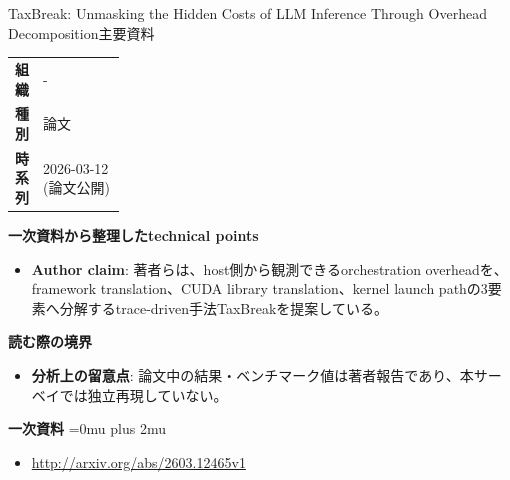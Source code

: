 \begin{technicalnote}{TaxBreak: Unmasking the Hidden Costs of LLM Inference Through Overhead Decomposition}{主要資料}
\begingroup
\begin{tabularx}{\linewidth}{@{}>{\bfseries}p{0.22\linewidth}X@{}}
組織 & - \\
種別 & 論文 \\
時系列 & 2026-03-12 (論文公開) \\
\end{tabularx}
\smallskip
{\bfseries 一次資料から整理したtechnical points}
\begin{itemize}[leftmargin=1.5em,itemsep=0.35em]
\item \textbf{Author claim}: 著者らは、host側から観測できるorchestration overheadを、framework translation、CUDA library translation、kernel launch pathの3要素へ分解するtrace-driven手法TaxBreakを提案している。
\end{itemize}
\begin{minipage}{\linewidth}
{\bfseries 読む際の境界}
\begin{itemize}[leftmargin=1.5em,itemsep=0.35em]
\item \textbf{分析上の留意点}: 論文中の結果・ベンチマーク値は著者報告であり、本サーベイでは独立再現していない。
\end{itemize}
\begin{samepage}
{\bfseries 一次資料}
\begingroup\sloppy
\Urlmuskip=0mu plus 2mu\relax
\begin{itemize}[leftmargin=1.5em,itemsep=0.25em]
\item {\scriptsize\url{http://arxiv.org/abs/2603.12465v1}}
\end{itemize}
\endgroup
\end{samepage}
\end{minipage}
\endgroup
\end{technicalnote}
\medskip

